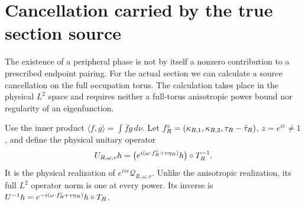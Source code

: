 \section{Cancellation carried by the true section source}
\label{sec:v39-section-source}
The existence of a peripheral phase is not by itself a nonzero
contribution to a prescribed endpoint pairing. For the actual section
we can calculate a source cancellation on the full occupation torus.
The calculation takes place in the physical $L^2$ space and requires
neither a full-torus anisotropic power bound nor regularity of an
eigenfunction.

Use the inner product $\langle f,g\rangle=\int\overline f g\,d\nu$.
Let $f_R^{\rm c}=(\kappa_{R,1},\kappa_{R,2},\tau_R-\bar\tau_R)$,
$z=e^{iv}\ne1$, and define the physical unitary operator
\begin{equation}\label{eq:v39-physical-unitary}
 U_{R,\omega,v}h
  =\bigl(e^{i(\omega\cdot f_R^{\rm c}+v\eta_R)}h\bigr)\circ T_R^{-1}.
\end{equation}
It is the physical realization of $e^{ivc}\mathcal Q_{R,\omega,v}$.
Unlike the anisotropic realization, its full $L^2$ operator norm is
one at every power. Its inverse is
$U^{-1}h=e^{-i(\omega\cdot f_R^{\rm c}+v\eta_R)}h\circ T_R$.

